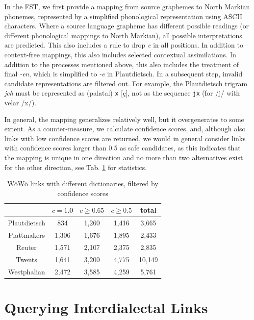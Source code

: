 \documentclass[11pt]{article}
\newcommand{\word}[1]{\textsl{#1}} %
\newcommand{\code}[1]{\texttt{#1}} %
\newcommand{\todo}[1]{}                                 %
\begin{document}
In the FST, we first provide a mapping from source graphemes to North Markian phonemes, represented by a simplified phonological representation using ASCII characters. Where a source language grapheme has different possible readings (or different phonological mappings to North Markian), all possible interpretations are predicted. This also includes a rule to drop \word{e} in all positions. In addition to context-free mappings, this also includes selected contextual assimilations. In addition to the processes mentioned above, this also includes the treatment of final \word{-en}, which is simplified to \word{-e} in Plautdietsch. In a subsequent step, invalid candidate representations are filtered out. For example, the Plautdietsch trigram \word{jch} must be represented as (palatal) \code{x} [ç], not as the sequence \code{jx} (for /j/ with velar /x/).

In general, the mapping generalizes relatively well, but it overgenerates to some extent. As a counter-measure, we calculate confidence scores, and, although also links with low confidence scores are returned, we would in general consider links with confidence scores larger than 0.5 as safe candidates, as this indicates that the mapping is unique in one direction and no more than two alternatives exist for the other direction, see Tab. \ref{tab-results} for statistics.\todo{add Sass to tab-results}



\begin{table}
{\small
\begin{tabular}{ccccc}
                & $c=1.0$   & $c\geq 0.65$  & $c \geq 0.5$  & total \\ \hline
Plautdietsch    & 834       & 1,260          & 1,416          & 3,665 \\
Plattmakers     & 1,306     & 1,676          & 1,895          & 2,433 \\
Reuter          & 1,571     & 2,107          & 2,375          & 2,835 \\
Twents          & 1,641     & 3,200          & 4,775          & 10,149\\
Westphalian     & 2,472     & 3,585          & 4,259          & 5,761 \\
\hline
\end{tabular}
} %
\caption{WöWö links with different dictionaries, filtered by confidence scores}
\label{tab-results}
\end{table}

\section{Querying Interdialectal Links}
\end{document}
